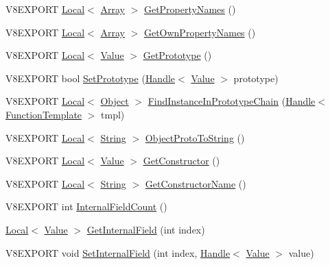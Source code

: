 \begin{DoxyCompactItemize}
\item 
V8\+E\+X\+P\+O\+R\+T \hyperlink{classv8_1_1_local}{Local}$<$ \hyperlink{classv8_1_1_array}{Array} $>$ \hyperlink{classv8_1_1_object_a0e28660353b6da64f9e2769260f31001}{Get\+Property\+Names} ()
\item 
V8\+E\+X\+P\+O\+R\+T \hyperlink{classv8_1_1_local}{Local}$<$ \hyperlink{classv8_1_1_array}{Array} $>$ \hyperlink{classv8_1_1_object_ab407b4e8dc83c3a75197f809d1465f7e}{Get\+Own\+Property\+Names} ()
\item 
V8\+E\+X\+P\+O\+R\+T \hyperlink{classv8_1_1_local}{Local}$<$ \hyperlink{classv8_1_1_value}{Value} $>$ \hyperlink{classv8_1_1_object_a171fc92c6e695d9c944f9e5d7670ed11}{Get\+Prototype} ()
\item 
V8\+E\+X\+P\+O\+R\+T bool \hyperlink{classv8_1_1_object_a2a1ab58bf92984255f767946eeff1199}{Set\+Prototype} (\hyperlink{classv8_1_1_handle}{Handle}$<$ \hyperlink{classv8_1_1_value}{Value} $>$ prototype)
\item 
V8\+E\+X\+P\+O\+R\+T \hyperlink{classv8_1_1_local}{Local}$<$ \hyperlink{classv8_1_1_object}{Object} $>$ \hyperlink{classv8_1_1_object_aa3b8aaece354c6af98b98e0ae9abe13d}{Find\+Instance\+In\+Prototype\+Chain} (\hyperlink{classv8_1_1_handle}{Handle}$<$ \hyperlink{classv8_1_1_function_template}{Function\+Template} $>$ tmpl)
\item 
V8\+E\+X\+P\+O\+R\+T \hyperlink{classv8_1_1_local}{Local}$<$ \hyperlink{classv8_1_1_string}{String} $>$ \hyperlink{classv8_1_1_object_a2dc22d2a2acf9eab4ed2965149e48af9}{Object\+Proto\+To\+String} ()
\item 
V8\+E\+X\+P\+O\+R\+T \hyperlink{classv8_1_1_local}{Local}$<$ \hyperlink{classv8_1_1_value}{Value} $>$ \hyperlink{classv8_1_1_object_a63861862c17e0fb2cf4e2d62b656f548}{Get\+Constructor} ()
\item 
V8\+E\+X\+P\+O\+R\+T \hyperlink{classv8_1_1_local}{Local}$<$ \hyperlink{classv8_1_1_string}{String} $>$ \hyperlink{classv8_1_1_object_a4851a914d3d95b5eb7238c664fb7fd16}{Get\+Constructor\+Name} ()
\item 
V8\+E\+X\+P\+O\+R\+T int \hyperlink{classv8_1_1_object_affaee480d3f50d5ac7a640db5aa8e89d}{Internal\+Field\+Count} ()
\item 
\hyperlink{classv8_1_1_local}{Local}$<$ \hyperlink{classv8_1_1_value}{Value} $>$ \hyperlink{classv8_1_1_object_aa3324fdf652d8ac3b2f27faa0559231d}{Get\+Internal\+Field} (int index)
\item 
V8\+E\+X\+P\+O\+R\+T void \hyperlink{classv8_1_1_object_a94e24494687ea499471d41e914eeb90d}{Set\+Internal\+Field} (int index, \hyperlink{classv8_1_1_handle}{Handle}$<$ \hyperlink{classv8_1_1_value}{Value} $>$ value)

\end{DoxyCompactItemize}

